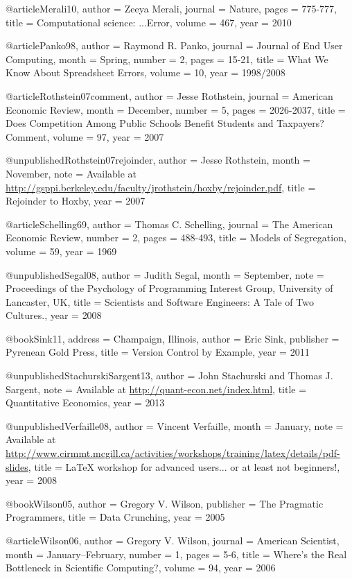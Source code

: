 @article{Merali10,
author  = {Zeeya Merali},
journal = {Nature},
pages   = {775-777},
title   = {Computational science: ...Error},
volume  = {467},
year    = {2010}
}

@article{Panko98,
author  = {Raymond R. Panko},
journal = {Journal of End User Computing},
month   = {Spring},
number  = {2},
pages   = {15-21},
title   = {What We Know About Spreadsheet Errors},
volume  = {10},
year    = {1998/2008}
}

@article{Rothstein07comment,
author  = {Jesse Rothstein},
journal = {American Economic Review},
month   = {December},
number  = {5},
pages   = {2026-2037},
title   = {Does Competition Among Public Schools Benefit Students and Taxpayers? {Comment}},
volume  = {97},
year    = {2007}
}

@unpublished{Rothstein07rejoinder,
author = {Jesse Rothstein},
month  = {November},
note   = {Available at \url{http://gsppi.berkeley.edu/faculty/jrothstein/hoxby/rejoinder.pdf}},
title  = {Rejoinder to {Hoxby}},
year   = {2007}
}

@article{Schelling69,
author  = {Thomas C. Schelling},
journal = {The American Economic Review},
number  = {2},
pages   = {488-493},
title   = {Models of Segregation},
volume  = {59},
year    = {1969}
}

@unpublished{Segal08,
author = {Judith Segal},
month  = {September},
note   = {Proceedings of the Psychology of Programming Interest Group, {University of Lancaster, UK}},
title  = {Scientists and Software Engineers: A Tale of Two Cultures.},
year   = {2008}
}

@book{Sink11,
address   = {Champaign, Illinois},
author    = {Eric Sink},
publisher = {Pyrenean Gold Press},
title     = {Version Control by Example},
year      = {2011}
}

@unpublished{StachurskiSargent13,
author = {John Stachurski and Thomas J. Sargent},
note   = {{Available at \url{http://quant-econ.net/index.html}}},
title  = {Quantitative Economics},
year   = {2013}
}

@unpublished{Verfaille08,
author = {Vincent Verfaille},
month  = {January},
note   = {Available at \url{http://www.cirmmt.mcgill.ca/activities/workshops/training/latex/details/pdf-slides}},
title  = {{\LaTeX} workshop for advanced users... or at least not beginners!},
year   = {2008}
}

@book{Wilson05,
author    = {Gregory V. Wilson},
publisher = {The Pragmatic Programmers},
title     = {Data Crunching},
year      = {2005}
}

@article{Wilson06,
author  = {Gregory V. Wilson},
journal = {American Scientist},
month   = {January--February},
number  = {1},
pages   = {5-6},
title   = {Where's the Real Bottleneck in Scientific Computing?},
volume  = {94},
year    = {2006}
}

